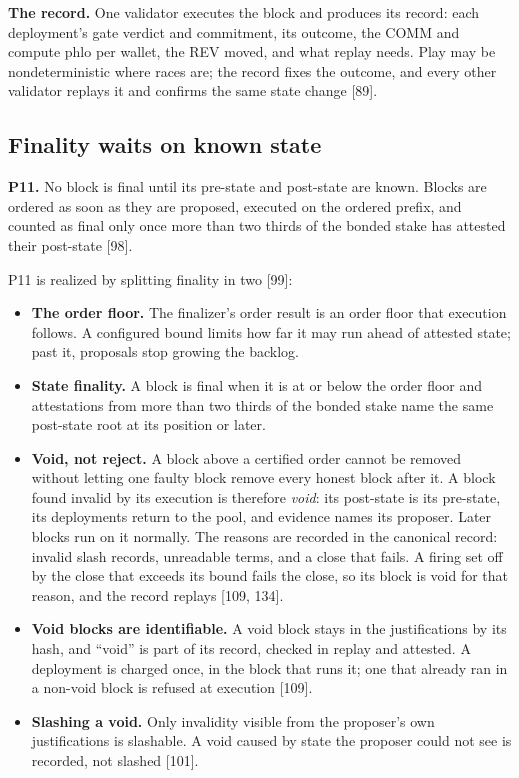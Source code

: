 \documentclass[10.5pt]{article}
\newcommand{\D}[1]{{\color{muted}\small[#1]}}
\begin{document}
\textbf{The record.} One validator executes the block and produces its record: each deployment's gate verdict and commitment, its outcome, the COMM and compute phlo per wallet, the REV moved, and what replay needs. Play may be nondeterministic where races are; the record fixes the outcome, and every other validator replays it and confirms the same state change \D{89}.

\subsection{Finality waits on known state}

\begin{keypoint}
\textbf{P11.} No block is final until its pre-state and post-state are known. Blocks are ordered as soon as they are proposed, executed on the ordered prefix, and counted as final only once more than two thirds of the bonded stake has attested their post-state \D{98}.
\end{keypoint}

P11 is realized by splitting finality in two \D{99}:
\begin{itemize}
\item \textbf{The order floor.} The finalizer's order result is an order floor that execution follows. A configured bound limits how far it may run ahead of attested state; past it, proposals stop growing the backlog.
\item \textbf{State finality.} A block is final when it is at or below the order floor and attestations from more than two thirds of the bonded stake name the same post-state root at its position or later.
\item \textbf{Void, not reject.} A block above a certified order cannot be removed without letting one faulty block remove every honest block after it. A block found invalid by its execution is therefore \emph{void}: its post-state is its pre-state, its deployments return to the pool, and evidence names its proposer. Later blocks run on it normally. The reasons are recorded in the canonical record: invalid slash records, unreadable terms, and a close that fails. A firing set off by the close that exceeds its bound fails the close, so its block is void for that reason, and the record replays \D{109, 134}.
\item \textbf{Void blocks are identifiable.} A void block stays in the justifications by its hash, and ``void'' is part of its record, checked in replay and attested. A deployment is charged once, in the block that runs it; one that already ran in a non-void block is refused at execution \D{109}.
\item \textbf{Slashing a void.} Only invalidity visible from the proposer's own justifications is slashable. A void caused by state the proposer could not see is recorded, not slashed \D{101}.
\end{itemize}
\end{document}
